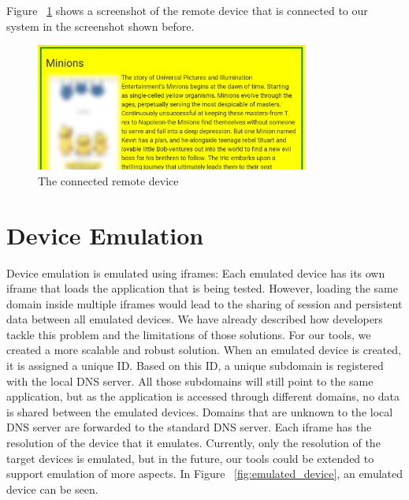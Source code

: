 Figure ~\ref{fig:complete_remote} shows a screenshot of the remote device that is connected to our system in the screenshot shown before.

\begin{figure}[H]
  \centering
    \includegraphics[width=0.8\textwidth]{images/screenshots/complete_remote_2.png}
	\caption{The connected remote device}
	\label{fig:complete_remote}
\end{figure}

\section{Device Emulation}

Device emulation is emulated using iframes: Each emulated device has its own iframe that loads the application that is being tested. However, loading the same domain inside multiple iframes would lead to the sharing of session and persistent data between all emulated devices. We have already described how developers tackle this problem and the limitations of those solutions. For our tools, we created a more scalable and robust solution. When an emulated device is created, it is assigned a unique ID. Based on this ID, a unique subdomain is registered with the local DNS server. All those subdomains will still point to the same application, but as the application is accessed through different domains, no data is shared between the emulated devices. Domains that are unknown to the local DNS server are forwarded to the standard DNS server. Each iframe has the resolution of the device that it emulates. Currently, only the resolution of the target devices is emulated, but in the future, our tools could be extended to support emulation of more aspects. In Figure ~\ref{fig:emulated_device}, an emulated device can be seen.

